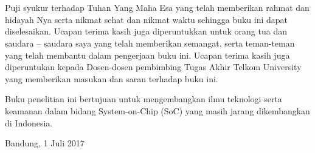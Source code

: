 \chapter*{\kataPengantar}

Puji syukur terhadap Tuhan Yang Maha Esa yang telah memberikan rahmat dan hidayah Nya serta nikmat sehat dan nikmat waktu sehingga buku ini dapat diselesaikan. Ucapan terima kasih juga diperuntukkan untuk orang tua dan saudara – saudara saya yang telah memberikan semangat, serta teman-teman yang telah membantu dalam pengerjaan buku ini. Ucapan terima kasih juga diperuntukan kepada Dosen-dosen pembimbing Tugas Akhir Telkom University yang memberikan masukan dan saran terhadap buku ini.

\vspace*{0.5cm}
Buku penelitian ini bertujuan untuk mengembangkan ilmu teknologi serta keamanan dalam bidang System-on-Chip (SoC) yang masih jarang dikembangkan di Indonesia. 

\vspace*{0.1cm}
\begin{flushright}
	Bandung, 1 Juli 2017\\[0.1cm]
	\vspace*{1cm}
	\penulis
	
\end{flushright}